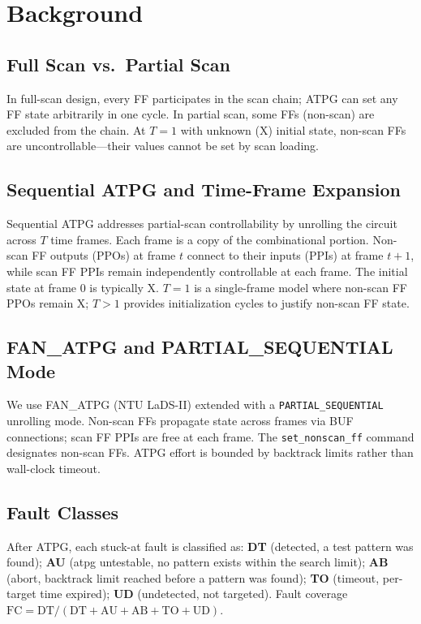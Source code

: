 \documentclass[conference]{IEEEtran}
\begin{document}
\section{Background}
\label{sec:background}

\subsection{Full Scan vs.\ Partial Scan}
In full-scan design, every FF participates in the scan chain; ATPG can set any
FF state arbitrarily in one cycle. In partial scan, some FFs (non-scan) are
excluded from the chain. At $T{=}1$ with unknown (X) initial state, non-scan
FFs are uncontrollable---their values cannot be set by scan loading.

\subsection{Sequential ATPG and Time-Frame Expansion}
Sequential ATPG addresses partial-scan controllability by unrolling the circuit
across $T$ time frames. Each frame is a copy of the combinational portion.
Non-scan FF outputs (PPOs) at frame $t$ connect to their inputs (PPIs) at frame
$t{+}1$, while scan FF PPIs remain independently controllable at each frame.
The initial state at frame 0 is typically X. $T{=}1$ is a single-frame model
where non-scan FF PPOs remain X; $T{>}1$ provides initialization cycles to
justify non-scan FF state.

\subsection{FAN\_ATPG and PARTIAL\_SEQUENTIAL Mode}
We use FAN\_ATPG (NTU LaDS-II) extended with a \texttt{PARTIAL\_SEQUENTIAL}
unrolling mode. Non-scan FFs propagate state across frames via BUF connections;
scan FF PPIs are free at each frame. The \texttt{set\_nonscan\_ff} command
designates non-scan FFs. ATPG effort is bounded by backtrack limits rather than
wall-clock timeout.

\subsection{Fault Classes}
After ATPG, each stuck-at fault is classified as: \textbf{DT} (detected, a test
pattern was found); \textbf{AU} (atpg untestable, no pattern exists within the
search limit); \textbf{AB} (abort, backtrack limit reached before a pattern was
found); \textbf{TO} (timeout, per-target time expired); \textbf{UD}
(undetected, not targeted). Fault coverage
$\mathrm{FC} = \mathrm{DT}/(\mathrm{DT}{+}\mathrm{AU}{+}\mathrm{AB}{+}\mathrm{TO}{+}\mathrm{UD})$.
\end{document}
